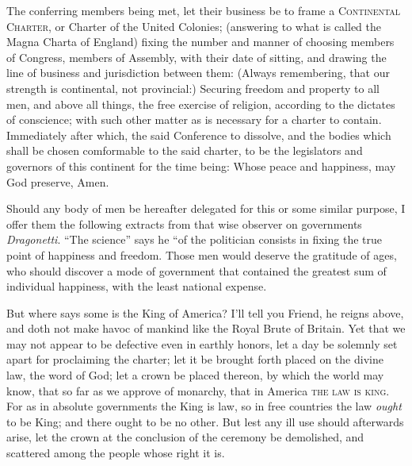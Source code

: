 \documentclass[12pt, twocolumn]{book}
\begin{document}
    The conferring members being met, let their business be to frame a \textsc{Continental Charter}, or Charter of the United Colonies; (answering to what is called the Magna Charta of England) fixing the number and manner of choosing members of Congress, members of Assembly, with their date of sitting, and drawing the line of business and jurisdiction between them: (Always remembering, that our strength is continental, not provincial:) Securing freedom and property to all men, and above all things, the free exercise of religion, according to the dictates of conscience; with such other matter as is necessary for a charter to contain. Immediately after which, the said Conference to dissolve, and the bodies which shall be chosen comformable to the said charter, to be the legislators and governors of this continent for the time being: Whose peace and happiness, may God preserve, Amen.

    Should any body of men be hereafter delegated for this or some similar purpose, I offer them the following extracts from that wise observer on governments \textit{Dragonetti}. “The science” says he “of the politician consists in fixing the true point of happiness and freedom. Those men would deserve the gratitude of ages, who should discover a mode of government that contained the greatest sum of individual happiness, with the least national expense.

    \medskip

    
    \medskip

    But where says some is the King of America? I’ll tell you Friend, he reigns above, and doth not make havoc of mankind like the Royal Brute of Britain. Yet that we may not appear to be defective even in earthly honors, let a day be solemnly set apart for proclaiming the charter; let it be brought forth placed on the divine law, the word of God; let a crown be placed thereon, by which the world may know, that so far as we approve of monarchy, that in America \textsc{the law is king}. For as in absolute governments the King is law, so in free countries the law \textit{ought} to be King; and there ought to be no other. But lest any ill use should afterwards arise, let the crown at the conclusion of the ceremony be demolished, and scattered among the people whose right it is.
\end{document}
